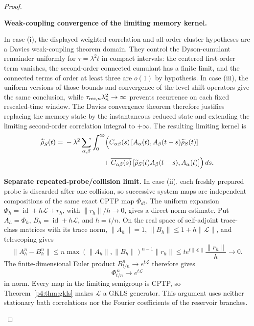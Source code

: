 \documentclass[12pt,a4paper]{article}
\begin{document}
\begin{proof}
\begin{proofsteps}
\item \textbf{Weak-coupling convergence of the limiting memory kernel.}
\leavevmode\par\noindent
In case (i), the displayed weighted correlation and all-order cluster
hypotheses are a Davies weak-coupling theorem domain.  They control the
Dyson-cumulant remainder uniformly for
\(\tau=\lambda^2t\) in compact intervals: the centered first-order term
vanishes, the second-order connected cumulant has a finite limit, and the
connected terms of order at least three are \(o(1)\) by hypothesis.  In
case (iii), the uniform versions of those bounds and convergence of the
level-shift operators give the same conclusion, while
\(\tau_{{\rm rec},n}\lambda_n^2\to\infty\) prevents recurrence on each fixed
rescaled-time window.  The Davies convergence theorem
\cite{Davies1974,Davies1976} therefore justifies replacing the memory state by
the instantaneous reduced state and extending the limiting second-order
correlation integral to \(+\infty\).  The resulting limiting kernel is
\[
\begin{aligned}
\dot{\widetilde\rho}_S(t)
={}&
-\lambda^2
\sum_{\alpha,\beta}
\int_0^\infty
\Bigl(
C_{\alpha\beta}(s)\,
[A_\alpha(t),A_\beta(t-s)\widetilde\rho_S(t)]
\\
&\hspace{5.5em}
+
\overline{C_{\alpha\beta}(s)}\,
[\widetilde\rho_S(t)A_\beta(t-s),A_\alpha(t)]
\Bigr)\,ds .
\end{aligned}
\]

\item \textbf{Separate repeated-probe/collision limit.}
In case (ii), each freshly prepared probe is discarded after one collision,
so successive system maps are independent compositions of the same exact
CPTP map \(\Phi_{dt}\).  The uniform expansion
\(\Phi_h=\operatorname{id}+h\mathcal L+r_h\), with
\(\|r_h\|/h\to0\), gives a direct norm estimate.  Put
\(A_h=\Phi_h\), \(B_h=\operatorname{id}+h\mathcal L\), and \(h=t/n\).
On the real space of self-adjoint trace-class matrices with its trace norm,
\(\|A_h\|=1\), \(\|B_h\|\le1+h\|\mathcal L\|\), and telescoping gives
\[
 \|A_h^n-B_h^n\|
 \le
 n\max(\|A_h\|,\|B_h\|)^{n-1}\|r_h\|
 \le
 t e^{t\|\mathcal L\|}\frac{\|r_h\|}{h}
 \longrightarrow0.
\]
The finite-dimensional Euler product \(B_{t/n}^n\to e^{t\mathcal L}\)
therefore gives
\[
\Phi_{t/n}^{\,n}\longrightarrow e^{t\mathcal L}
\]
in norm.  Every map in the limiting semigroup is CPTP, so
Theorem~\ref{p4:thm:gkls} makes \(\mathcal L\) a GKLS generator.  This
argument uses neither stationary bath correlations nor the Fourier
coefficients of the reservoir branches.



\end{proofsteps}
\end{proof}
\end{document}
